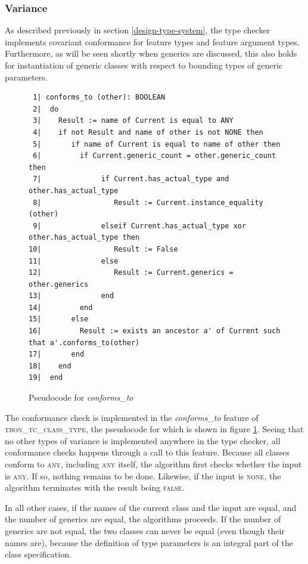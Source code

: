 \subsubsection{Variance}
\label{implementation-variance}
As described previously in section \ref{design-type-system}, the type checker implements covariant conformance for feature types and feature argument types. Furthermore, as will be seen shortly when generics are discussed, this also holds for instantiation of generic classes with respect to bounding types of generic parameters.
\begin{figure}[H]
{\footnotesize
\begin{verbatim}
 1| conforms_to (other): BOOLEAN
 2|  do
 3|    Result := name of Current is equal to ANY
 4|    if not Result and name of other is not NONE then
 5|       if name of Current is equal to name of other then
 6|         if Current.generic_count = other.generic_count then
 7|              if Current.has_actual_type and other.has_actual_type
 8|                 Result := Current.instance_equality (other)
 9|              elseif Current.has_actual_type xor other.has_actual_type then
10|                 Result := False
11|              else
12|                 Result := Current.generics = other.generics
13|              end
14|         end
15|       else
16|         Result := exists an ancestor a' of Current such that a'.conforms_to(other)
17|       end
18|    end
19|  end
\end{verbatim}
}
\caption{Pseudocode for \textit{conforms\_to}}
\label{fig:conforms_to}
\end{figure}
The conformance check is implemented in the \textit{conforms\_to} feature of \textsc{tbon\_tc\_class\_type}, the pseudocode for which is shown in figure \ref{fig:conforms_to}. Seeing that no other types of variance is implemented anywhere in the type checker, all conformance checks happens through a call to this feature.
Because all classes conform to \textsc{any}, including \textsc{any} itself, the algorithm first checks whether the input is \textsc{any}. If so, nothing remains to be done. Likewise, if the input is \textsc{none}, the algorithm terminates with the result being \textsc{false}.

In all other cases, if the names of the current class and the input are equal, and the number of generics are equal, the algorithms proceeds. If the number of generics are not equal, the two classes can never be equal (even though their names are), because the definition of type parameters is an integral part of the class specification.

